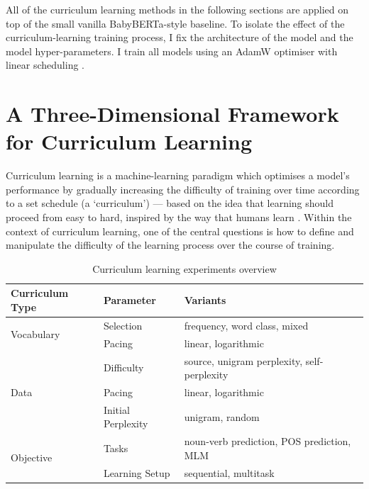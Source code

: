 All of the curriculum learning methods in the following sections are applied on top of the small vanilla BabyBERTa-style baseline. To isolate the effect of the curriculum-learning training process, I fix the architecture of the model and the model hyper-parameters. I train all models using an AdamW optimiser with linear scheduling \citep{loshchilov2019decoupled}.

\section{A Three-Dimensional Framework for Curriculum Learning}
\label{sec:three-dimensional-framework}
Curriculum learning \citep{bengio2009curriculum} is a machine-learning paradigm which optimises a model's performance by gradually increasing the difficulty of training over time according to a set schedule (a `curriculum') --- based on the idea that learning should proceed from easy to hard, inspired by the way that humans learn \citep{elman1993learning}.
Within the context of curriculum learning, one of the central questions is how to define and manipulate the difficulty of the learning process over the course of training. 

\begin{table}[H]
    \centering
    \small
    \begin{tabular}{lll}
    \toprule
    \textbf{Curriculum Type} & \textbf{Parameter} &\textbf{Variants} \\
    \midrule
     \multirow{2}{*}{Vocabulary} & Selection & frequency, word class, mixed \\
     & Pacing & linear, logarithmic \\
     \midrule
     \multirow{3}{*}{Data} & Difficulty & source, unigram perplexity, self-perplexity \\
     & Pacing & linear, logarithmic \\
     & Initial Perplexity & unigram, random \\
      \midrule
     \multirow{2}{*}{Objective} & Tasks & noun-verb prediction, POS prediction, MLM\\
     & Learning Setup & sequential, multitask \\
    \bottomrule
    \end{tabular}
    \caption{\label{tbl:configurations} Curriculum learning experiments overview}
\end{table}

